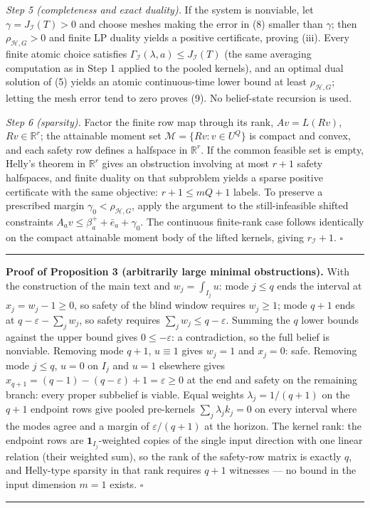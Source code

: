 \documentclass[10pt,article]{article}
\newcommand{\rulebar}{\begin{center}\rule{0.5\linewidth}{0.5pt}\end{center}}
\begin{document}
\emph{Step 5 (completeness and exact duality).} If the system is nonviable,
let \(\gamma = J_{\mathcal I}(T) > 0\) and choose meshes making the error in
(8) smaller than \(\gamma\); then \(\rho_{\mathcal H,G} > 0\) and finite LP
duality yields a positive certificate, proving (iii). Every finite atomic
choice satisfies \(\Gamma_{\mathcal I}(\lambda, a) \le J_{\mathcal I}(T)\)
(the same averaging computation as in Step 1 applied to the pooled kernels),
and an optimal dual solution of (5) yields an atomic continuous-time lower
bound at least \(\rho_{\mathcal H,G}\); letting the mesh error tend to zero
proves (9). No belief-state recursion is used.

\emph{Step 6 (sparsity).} Factor the finite row map through its rank,
\(A v = L(Rv)\), \(Rv \in \mathbb R^{r}\); the attainable moment set
\(\mathcal M = \{Rv : v \in U^{Q}\}\) is compact and convex, and each safety
row defines a halfspace in \(\mathbb R^{r}\). If the common feasible set is
empty, Helly's theorem in \(\mathbb R^{r}\) gives an obstruction involving at
most \(r + 1\) safety halfspaces, and finite duality on that subproblem
yields a sparse positive certificate with the same objective: \(r + 1 \le mQ
+ 1\) labels. To preserve a prescribed margin \(\gamma_0 < \rho_{\mathcal
H,G}\), apply the argument to the still-infeasible shifted constraints \(A_a
v \le \beta_a^{+} + \bar e_a + \gamma_0\). The continuous finite-rank case
follows identically on the compact attainable moment body of the lifted
kernels, giving \(r_{\mathcal I} + 1\). \hfill\(\square\)
\rulebar

\textbf{Proof of Proposition 3 (arbitrarily large minimal obstructions).}
With the construction of the main text and \(w_j = \int_{I_j} u\): mode
\(j \le q\) ends the interval at \(x_j = w_j - 1 \ge 0\), so safety of the
blind window requires \(w_j \ge 1\); mode \(q+1\) ends at \(q - \varepsilon -
\sum_j w_j\), so safety requires \(\sum_j w_j \le q - \varepsilon\). Summing
the \(q\) lower bounds against the upper bound gives \(0 \le -\varepsilon\):
a contradiction, so the full belief is nonviable. Removing mode \(q+1\),
\(u \equiv 1\) gives \(w_j = 1\) and \(x_j = 0\): safe. Removing mode \(j \le
q\), \(u = 0\) on \(I_j\) and \(u = 1\) elsewhere gives \(x_{q+1} =
(q-1) - (q - \varepsilon) + 1 = \varepsilon \ge 0\) at the end and safety on
the remaining branch: every proper subbelief is viable. Equal weights
\(\lambda_j = 1/(q{+}1)\) on the \(q+1\) endpoint rows give pooled pre-kernels
\(\sum_j \lambda_j k_j = 0\) on every interval where the modes agree and a
margin of \(\varepsilon/(q{+}1)\) at the horizon. The kernel rank: the
endpoint rows are \(\mathbf 1_{I_j}\)-weighted copies of the single input
direction with one linear relation (their weighted sum), so the rank of the
safety-row matrix is exactly \(q\), and Helly-type sparsity in that rank
requires \(q + 1\) witnesses --- no bound in the input dimension \(m = 1\)
exists. \hfill\(\square\)
\rulebar
\end{document}
